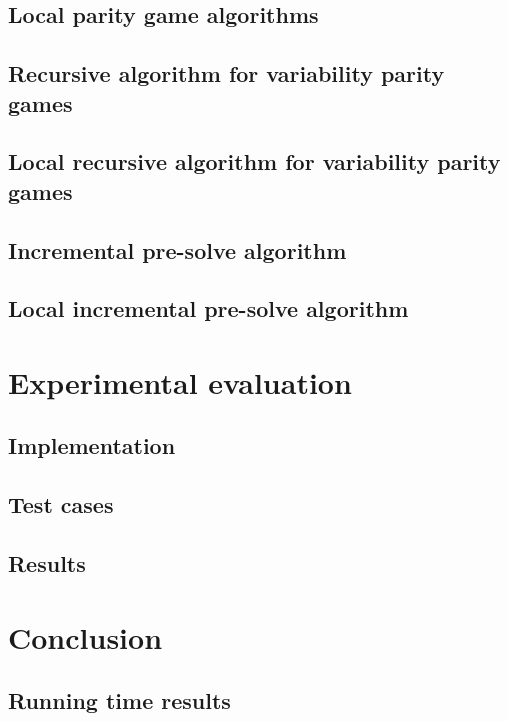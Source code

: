 \documentclass[]{article}
\begin{document}
\subsection{Local parity game algorithms}


\subsection{Recursive algorithm for variability parity games}


\subsection{Local recursive algorithm for variability parity games}


\subsection{Incremental pre-solve algorithm}


\subsection{Local incremental pre-solve algorithm}


\pagebreak
\section{Experimental evaluation}


\subsection{Implementation}


\subsection{Test cases}


\subsection{Results}


\pagebreak
\section{Conclusion}


\pagebreak
\begin{appendices}
\section{Running time results}
\label{appendix:resultsexact}

\end{appendices}

 

\end{document}
